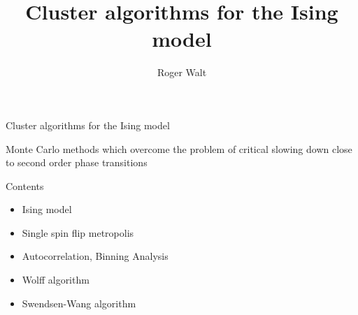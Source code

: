 \documentclass[handout]{beamer}
\begin{document}
\title{Cluster algorithms for the Ising model}
\author{Roger Walt}

\begin{frame}
	\huge{Cluster algorithms for the Ising model}
	\vspace*{5pt}

	\Large{Monte Carlo methods which overcome the problem of critical slowing down close to second order phase transitions}
	\note{ }
\end{frame}

\begin{frame}{Contents}
\begin{itemize}
\item Ising model
\item Single spin flip metropolis
\item Autocorrelation, Binning Analysis
\item Wolff algorithm
\item Swendsen-Wang algorithm
\end{itemize}
\note{ }
\end{frame}
\end{document}
